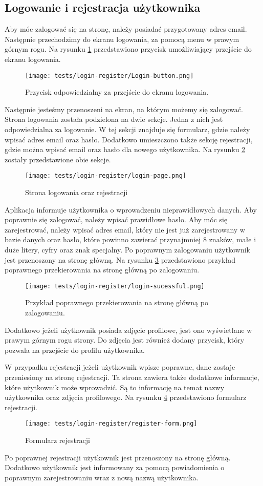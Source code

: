 \subsection{Logowanie i rejestracja użytkownika}
Aby móc zalogować się na stronę, należy posiadać przygotowany adres email. Następnie przechodzimy do ekranu logowania, za pomocą menu w prawym górnym rogu. Na rysunku \ref{login_menu} przedstawiono przycisk umożliwiający przejście do ekranu logowania.
\begin{figure}[H]
  \centering
  \texttt{[image: tests/login-register/Login-button.png]}
  \caption{Przycisk odpowiedzialny za przejście do ekranu logowania.}
  \label{login_menu}
\end{figure}
Następnie jesteśmy przenoszeni na ekran, na którym możemy się zalogować. Strona logowania została podzielona na dwie sekcje. Jedna z nich jest odpowiedzialna za logowanie. W tej sekcji znajduje się formularz, gdzie należy wpisać adres email oraz hasło. Dodatkowo umieszczono także sekcję rejestracji, gdzie można wpisać email oraz hasło dla nowego użytkownika. Na rysunku \ref{login_page} zostały przedstawione obie sekcje.
\begin{figure}[H]
  \centering
  \texttt{[image: tests/login-register/login-page.png]}
  \caption{Strona logowania oraz rejestracji}
  \label{login_page}
\end{figure}
Aplikacja informuje użytkownika o wprowadzeniu nieprawidłowych danych. Aby poprawnie się zalogować, należy wpisać prawidłowe hasło. Aby móc się zarejestrować, należy wpisać adres email, który nie jest już zarejestrowany w bazie danych oraz hasło, które powinno zawierać przynajmniej 8 znaków, małe i duże litery, cyfry oraz znak specjalny. Po poprawnym zalogowaniu użytkownik jest przenoszony na stronę główną. Na rysunku \ref{login_success} przedstawiono przykład poprawnego przekierowania na stronę główną po zalogowaniu. 
\begin{figure}[H]
  \centering
  \texttt{[image: tests/login-register/login-sucessful.png]}
  \caption{Przykład poprawnego przekierowania na stronę główną po zalogowaniu.}
  \label{login_success}
\end{figure}
Dodatkowo jeżeli użytkownik posiada zdjęcie profilowe, jest ono wyświetlane w prawym górnym rogu strony. Do zdjęcia jest również dodany przycisk, który pozwala na przejście do profilu użytkownika.

W przypadku rejestracji jeżeli użytkownik wpisze poprawne, dane zostaje przeniesiony na stronę rejestracji. Ta strona zawiera także dodatkowe informacje, które użytkownik może wprowadzić. Są to informację na temat nazwy użytkownika oraz zdjęcia profilowego. Na rysunku \ref{register_page} przedstawiono formularz rejestracji.
\begin{figure}[H]
  \centering
  \texttt{[image: tests/login-register/register-form.png]}
  \caption{Formularz rejestracji}
  \label{register_page}
\end{figure}
Po poprawnej rejestracji użytkownik jest przenoszony na stronę główną. Dodatkowo użytkownik jest informowany za pomocą powiadomienia o poprawnym zarejestrowaniu wraz z nową nazwą użytkownika. 

